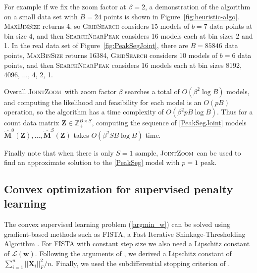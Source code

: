 \documentclass{article} %
\newcommand{\ZZ}{\mathbb Z}
\newcommand{\JointHeuristic}{\textsc{JointZoom}}
\begin{document}
For example if we fix the zoom factor at
$\beta=2$, a demonstration of the algorithm on a small data set 
with $B=24$ points is shown in
Figure~\ref{fig:heuristic-algo}. \textsc{MaxBinSize} returns 4, so
\textsc{GridSearch} considers 15 models of $b=7$ data points at bin
size 4, and then \textsc{SearchNearPeak} considers 16 models each at
bin sizes 2 and 1. In the real data set of
Figure~\ref{fig:PeakSegJoint}, there are $B=85846$ data points,
\textsc{MaxBinSize} returns 16384, \textsc{GridSearch} considers 10
models of $b=6$ data points, and then \textsc{SearchNearPeak}
considers 16 models each at bin sizes 8192, 4096, ..., 4, 2, 1.

Overall \JointHeuristic\ with zoom factor $\beta$ searches a total of
$O(\beta^2\log B)$ models, and computing the likelihood and
feasibility for each model is an $O(pB)$ operation, so the algorithm
has a time complexity of $O(\beta^2 pB\log B)$. Thus for a count data
matrix $\mathbf Z\in\ZZ_+^{B\times S}$, computing the sequence of
\ref{PeakSegJoint} models $\mathbf{\hat M}^0(\mathbf Z), \dots,
\mathbf{\hat M}^S(\mathbf Z)$ takes $O(\beta^2 S B\log B)$ time.

Finally note that when there is only $S=1$ sample, \JointHeuristic\
can be used to find an approximate solution to the \ref{PeakSeg} model
with $p=1$ peak.

\subsection{Convex optimization for supervised penalty learning}

The convex supervised learning problem (\ref{argmin_w}) can be
solved using gradient-based methods such as FISTA, a Fast Iterative
Shinkage-Thresholding Algorithm \citep{fista}. 
For FISTA with constant step size we also need a Lipschitz constant of
$\mathcal L(\mathbf w)$. Following the arguments of
\citet{hingeSquareFISTA}, we derived a Lipschitz constant of
$\sum_{i=1}^n ||\mathbf X_i||_F^2/n$. Finally, we used the
subdifferential stopping criterion of \citet{HOCKING-penalties}.
\end{document}
